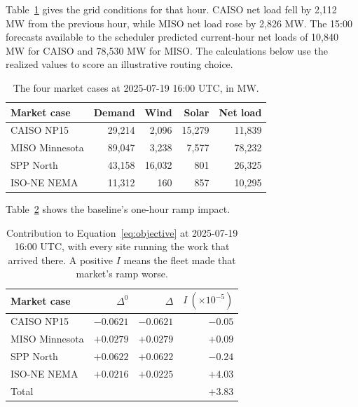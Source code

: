 \documentclass[conference]{IEEEtran}
\begin{document}
Table~\ref{tab:energy-example-rows} gives the grid conditions for that hour.
CAISO net load fell by 2,112 MW from the previous hour, while MISO net load
rose by 2,826 MW. The 15:00 forecasts available to the scheduler predicted
current-hour net loads of 10,840 MW for CAISO and 78,530 MW for MISO.
The calculations below use the realized values to score an illustrative
routing choice.

\begin{table}[htbp]
  \centering
  \footnotesize
  \caption{The four market cases at 2025-07-19 16:00 UTC, in MW.}
  \label{tab:energy-example-rows}
  \begin{tabular}{@{}lrrrr@{}}
    \toprule
    Market case & Demand & Wind & Solar & Net load \\
    \midrule
    CAISO NP15     & 29,214 &  2,096 & 15,279 & 11,839 \\
    MISO Minnesota & 89,047 &  3,238 &  7,577 & 78,232 \\
    SPP North      & 43,158 & 16,032 &    801 & 26,325 \\
    ISO-NE NEMA    & 11,312 &    160 &    857 & 10,295 \\
    \bottomrule
  \end{tabular}
\end{table}

Table~\ref{tab:objective-example} shows the baseline's one-hour ramp impact.

\begin{table}[htbp]
  \centering
  \footnotesize
  \caption{Contribution to Equation~\eqref{eq:objective} at
  2025-07-19 16:00 UTC, with every site running the work that arrived there.
  A positive \(I\) means the fleet made that market's ramp worse.}
  \label{tab:objective-example}
  \begin{tabular}{@{}lrrr@{}}
    \toprule
    Market case & \(\Delta^0\) & \(\Delta\) & \(I\ (\times10^{-5})\) \\
    \midrule
    CAISO NP15     & \(-0.0621\) & \(-0.0621\) & \(-0.05\) \\
    MISO Minnesota & \(+0.0279\) & \(+0.0279\) & \(+0.09\) \\
    SPP North      & \(+0.0622\) & \(+0.0622\) & \(-0.24\) \\
    ISO-NE NEMA    & \(+0.0216\) & \(+0.0225\) & \(+4.03\) \\
    \midrule
    Total          &             &             & \(+3.83\) \\
    \bottomrule
  \end{tabular}
\end{table}
\end{document}
